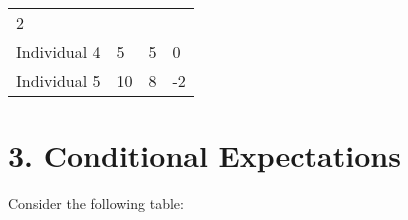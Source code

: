 \documentclass[]{article}
\begin{document}
\begin{longtable}[]{@{}llll@{}}
\begin{minipage}[t]{0.16\columnwidth}
2\strut
\end{minipage}\tabularnewline
\begin{minipage}[t]{0.20\columnwidth}\raggedright
Individual 4\strut
\end{minipage} & \begin{minipage}[t]{0.16\columnwidth}\raggedright
5\strut
\end{minipage} & \begin{minipage}[t]{0.16\columnwidth}\raggedright
5\strut
\end{minipage} & \begin{minipage}[t]{0.16\columnwidth}\raggedright
0\strut
\end{minipage}\tabularnewline
\begin{minipage}[t]{0.20\columnwidth}\raggedright
Individual 5\strut
\end{minipage} & \begin{minipage}[t]{0.16\columnwidth}\raggedright
10\strut
\end{minipage} & \begin{minipage}[t]{0.16\columnwidth}\raggedright
8\strut
\end{minipage} & \begin{minipage}[t]{0.16\columnwidth}\raggedright
-2\strut
\end{minipage}\tabularnewline
\bottomrule
\end{longtable}

\hypertarget{conditional-expectations}{%
\section{3. Conditional Expectations}\label{conditional-expectations}}

Consider the following table:
\end{document}
